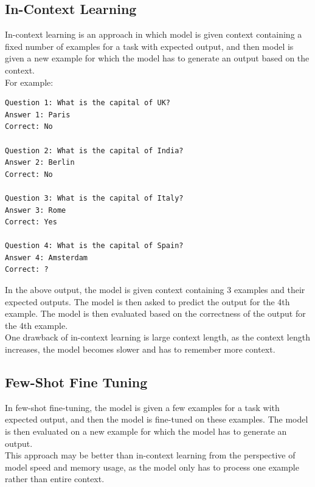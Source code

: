 \documentclass[10pt,twocolumn,letterpaper]{article}
\begin{document}
\subsection{In-Context Learning}
In-context learning is an approach in which model is given context containing a fixed number of examples for a task with expected output, and then model is given a 
new example for which the model has to generate an output based on the context. \\
For example:
\begin{verbatim}
Question 1: What is the capital of UK?
Answer 1: Paris
Correct: No
        
Question 2: What is the capital of India?
Answer 2: Berlin
Correct: No
        
Question 3: What is the capital of Italy?
Answer 3: Rome
Correct: Yes
        
Question 4: What is the capital of Spain?
Answer 4: Amsterdam
Correct: ?
\end{verbatim}
In the above output, the model is given context containing 3 examples and their expected outputs. The model is then asked to predict the output for the 4th example. The model is then evaluated based on the correctness of the output for the 4th example. \\
One drawback of in-context learning is large context length, as the context length increases, the model becomes slower and has to remember more context.

\subsection{Few-Shot Fine Tuning}
In few-shot fine-tuning, the model is given a few examples for a task with expected output, and then the model is fine-tuned on these examples. The model is then evaluated on a new example for which the model has to generate an output. \\
This approach may be better than in-context learning from the perspective of model speed and memory usage, as the model only has to process one example rather than entire context.
\end{document}
